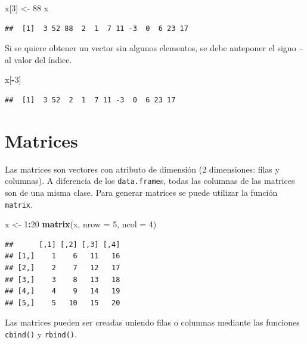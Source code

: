 \documentclass[]{book}
\newenvironment{Shaded}{\begin{snugshade}}{\end{snugshade}}
\newcommand{\KeywordTok}[1]{\textcolor[rgb]{0.13,0.29,0.53}{\textbf{#1}}}
\newcommand{\DataTypeTok}[1]{\textcolor[rgb]{0.13,0.29,0.53}{#1}}
\newcommand{\DecValTok}[1]{\textcolor[rgb]{0.00,0.00,0.81}{#1}}
\newcommand{\StringTok}[1]{\textcolor[rgb]{0.31,0.60,0.02}{#1}}
\newcommand{\OperatorTok}[1]{\textcolor[rgb]{0.81,0.36,0.00}{\textbf{#1}}}
\newcommand{\NormalTok}[1]{#1}
\begin{document}
\begin{Shaded}
\begin{Highlighting}[]
\NormalTok{x[}\DecValTok{3}\NormalTok{] <-}\StringTok{  }\DecValTok{88}
\NormalTok{x}
\end{Highlighting}
\end{Shaded}

\begin{verbatim}
##  [1]  3 52 88  2  1  7 11 -3  0  6 23 17
\end{verbatim}

Si se quiere obtener un vector sin algunos elementos, se debe anteponer
el signo \texttt{-} al valor del índice.

\begin{Shaded}
\begin{Highlighting}[]
\NormalTok{x[}\OperatorTok{-}\DecValTok{3}\NormalTok{]}
\end{Highlighting}
\end{Shaded}

\begin{verbatim}
##  [1]  3 52  2  1  7 11 -3  0  6 23 17
\end{verbatim}

\hypertarget{matrices}{%
\section{Matrices}\label{matrices}}

Las matrices son vectores con atributo de dimensión (2 dimensiones:
filas y columnas). A diferencia de los \texttt{data.frame}s, todas las
columnas de las matrices son de una misma clase. Para generar matrices
se puede utilizar la función \texttt{matrix}.

\begin{Shaded}
\begin{Highlighting}[]
\NormalTok{x <-}\StringTok{ }\DecValTok{1}\OperatorTok{:}\DecValTok{20}
\KeywordTok{matrix}\NormalTok{(x, }\DataTypeTok{nrow =} \DecValTok{5}\NormalTok{, }\DataTypeTok{ncol =} \DecValTok{4}\NormalTok{)}
\end{Highlighting}
\end{Shaded}

\begin{verbatim}
##      [,1] [,2] [,3] [,4]
## [1,]    1    6   11   16
## [2,]    2    7   12   17
## [3,]    3    8   13   18
## [4,]    4    9   14   19
## [5,]    5   10   15   20
\end{verbatim}

Las matrices pueden ser creadas uniendo filas o columnas mediante las
funciones \texttt{cbind()} y \texttt{rbind()}.
\end{document}
